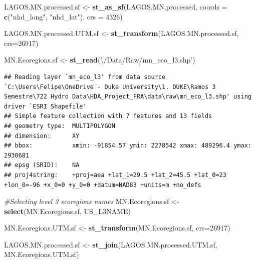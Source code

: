 \documentclass[12pt,]{article}
\newenvironment{Shaded}{\begin{snugshade}}{\end{snugshade}}
\newcommand{\CommentTok}[1]{\textcolor[rgb]{0.56,0.35,0.01}{\textit{#1}}}
\newcommand{\DataTypeTok}[1]{\textcolor[rgb]{0.13,0.29,0.53}{#1}}
\newcommand{\DecValTok}[1]{\textcolor[rgb]{0.00,0.00,0.81}{#1}}
\newcommand{\KeywordTok}[1]{\textcolor[rgb]{0.13,0.29,0.53}{\textbf{#1}}}
\newcommand{\NormalTok}[1]{#1}
\newcommand{\OperatorTok}[1]{\textcolor[rgb]{0.81,0.36,0.00}{\textbf{#1}}}
\newcommand{\StringTok}[1]{\textcolor[rgb]{0.31,0.60,0.02}{#1}}
\begin{document}
\begin{Shaded}
\end{Shaded}

\begin{Shaded}
\begin{Highlighting}[]
\NormalTok{LAGOS.MN.processed.sf <-}\StringTok{ }\KeywordTok{st_as_sf}\NormalTok{(LAGOS.MN.processed, }
                                  \DataTypeTok{coords =} \KeywordTok{c}\NormalTok{(}\StringTok{"nhd_long"}\NormalTok{, }\StringTok{"nhd_lat"}\NormalTok{), }\DataTypeTok{crs =} \DecValTok{4326}\NormalTok{)}

\NormalTok{LAGOS.MN.processed.UTM.sf <-}\StringTok{ }\KeywordTok{st_transform}\NormalTok{(LAGOS.MN.processed.sf, }\DataTypeTok{crs=}\DecValTok{26917}\NormalTok{)}

\NormalTok{MN.Ecoregions.sf <-}\StringTok{ }\KeywordTok{st_read}\NormalTok{(}\StringTok{'./Data/Raw/mn_eco_l3.shp'}\NormalTok{)}
\end{Highlighting}
\end{Shaded}

\begin{verbatim}
## Reading layer `mn_eco_l3' from data source `C:\Users\Felipe\OneDrive - Duke University\1. DUKE\Ramos 3 Semestre\722 Hydro Data\HDA_Project_FRA\data\raw\mn_eco_l3.shp' using driver `ESRI Shapefile'
## Simple feature collection with 7 features and 13 fields
## geometry type:  MULTIPOLYGON
## dimension:      XY
## bbox:           xmin: -91854.57 ymin: 2278542 xmax: 489296.4 ymax: 2930681
## epsg (SRID):    NA
## proj4string:    +proj=aea +lat_1=29.5 +lat_2=45.5 +lat_0=23 +lon_0=-96 +x_0=0 +y_0=0 +datum=NAD83 +units=m +no_defs
\end{verbatim}

\begin{Shaded}
\begin{Highlighting}[]
\CommentTok{#Selecting level 3 ecoregions names}
\NormalTok{MN.Ecoregions.sf <-}\StringTok{ }\KeywordTok{select}\NormalTok{(MN.Ecoregions.sf, US_L3NAME)}

\NormalTok{MN.Ecoregions.UTM.sf <-}\StringTok{ }\KeywordTok{st_transform}\NormalTok{(MN.Ecoregions.sf, }\DataTypeTok{crs=}\DecValTok{26917}\NormalTok{)}

\NormalTok{LAGOS.MN.processed.sf <-}\StringTok{ }\KeywordTok{st_join}\NormalTok{(LAGOS.MN.processed.UTM.sf, MN.Ecoregions.UTM.sf)}
\end{Highlighting}
\end{Shaded}
\end{document}
